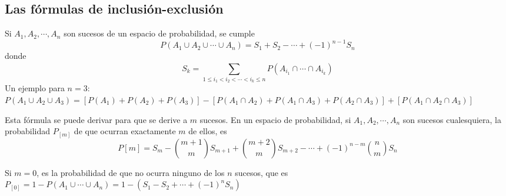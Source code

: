 \documentclass[a4paper, 11pt]{extarticle}
\begin{document}
\begin{multicols*}{2}
\section*{Las fórmulas de inclusión-exclusión}
\label{sec:org84583b5}
\vspace{-1.5em}
Si \(A_1, A_2, \cdots, A_n\) son sucesos de un espacio de probabilidad, se
cumple 
\[ P(A_1 \cup A_2 \cup \cdots \cup A_n) = S_1 + S_2 - \cdots + (-1)^{n-1}S_n \]
donde
\[ S_k = \sum _{1 \le i_1 < i_2 < \cdots < i_k \le n}^{} P(A_{i_1} \cap \cdots
\cap A_{i_k} ) \]
Un ejemplo para \(n=3\): \(P(A_1 \cup A_2 \cup A_3) = [P(A_1) + P(A_2) +
P(A_3)] - [P(A_1 \cap A_2) + P(A_1 \cap A_3) + P(A_2 \cap A_3)] + [P(A_1 \cap
A_2 \cap A_3)]\)

Esta fórmula se puede derivar para que se derive a \(m\) sucesos. En un espacio de
probabilidad, si \(A_1, A_2, \cdots, A_n\) son sucesos cualesquiera, la
probabilidad \(P_{[m]}\) de que ocurran exactamente \(m\) de ellos, es
\[ P{[m]} = S_m - {m+1 \choose m} S_{m+1} + {m+2 \choose m} S_{m+2} - \cdots +
(-1)^{n-m}{n \choose m}S_n  \]

Si \(m=0\), es la probabilidad de que no ocurra ninguno de los \(n\)
sucesos, que es \(P_{[0]} = 1 - P(A_1 \cup \cdots \cup A_n) = 1 - (S_1 - S_2 +
\cdots + (-1)^{n}S_n)\)

\end{multicols*}
\pagebreak
\end{document}
